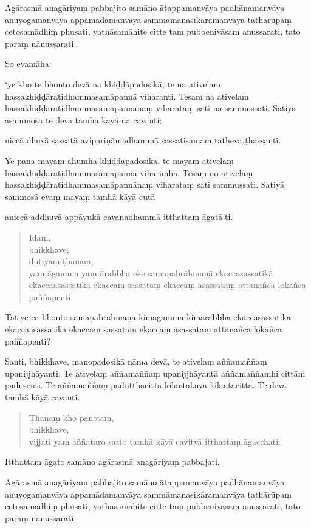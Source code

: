 \documentclass[11pt,twoside,openright]{book}
\begin{document}
\pstart
Agārasmā anagāriyaṃ pabbajito samāno ātappamanvāya padhānamanvāya anuyogamanvāya appamādamanvāya sammāmanasikāramanvāya tathārūpaṃ cetosamādhiṃ phusati, yathāsamāhite citte taṃ pubbenivāsaṃ anussarati, tato paraṃ nānussarati.
\pend

\pstart
So evamāha:
\pend

\pstart
‘ye kho te bhonto devā na khiḍḍāpadosikā, te na ativelaṃ hassakhiḍḍāratidhammasamāpannā viharanti. Tesaṃ na ativelaṃ hassakhiḍḍāratidhammasamāpannānaṃ viharataṃ sati na sammussati. Satiyā asammosā te devā tamhā kāyā na cavanti;
\pend

\pstart
niccā dhuvā sassatā avipariṇāmadhammā sassatisamaṃ tatheva ṭhassanti.
\pend

\pstart
Ye pana mayaṃ ahumhā khiḍḍāpadosikā, te mayaṃ ativelaṃ hassakhiḍḍāratidhammasamāpannā viharimhā. Tesaṃ no ativelaṃ hassakhiḍḍāratidhammasamāpannānaṃ viharataṃ sati sammussati. Satiyā sammosā evaṃ mayaṃ tamhā kāyā cutā
\pend

\pstart
aniccā addhuvā appāyukā cavanadhammā itthattaṃ āgatā’ti.
\pend

\begin{verse}
Idaṃ,\\
\vin  bhikkhave,\\
\vin  dutiyaṃ ṭhānaṃ,\\
\vin  yaṃ āgamma yaṃ ārabbha eke samaṇabrāhmaṇā ekaccasassatikā ekaccaasassatikā ekaccaṃ sassataṃ ekaccaṃ asassataṃ attānañca lokañca paññapenti.

\end{verse}
\pstart
Tatiye ca bhonto samaṇabrāhmaṇā kimāgamma kimārabbha ekaccasassatikā ekaccaasassatikā ekaccaṃ sassataṃ ekaccaṃ asassataṃ attānañca lokañca paññapenti?
\pend

\pstart
Santi, bhikkhave, manopadosikā nāma devā, te ativelaṃ aññamaññaṃ upanijjhāyanti. Te ativelaṃ aññamaññaṃ upanijjhāyantā aññamaññamhi cittāni padūsenti. Te aññamaññaṃ paduṭṭhacittā kilantakāyā kilantacittā. Te devā tamhā kāyā cavanti.
\pend

\begin{verse}
Ṭhānaṃ kho panetaṃ,\\
\vin  bhikkhave,\\
\vin  vijjati yaṃ aññataro satto tamhā kāyā cavitvā itthattaṃ āgacchati.

\end{verse}
\pstart
Itthattaṃ āgato samāno agārasmā anagāriyaṃ pabbajati.
\pend

\pstart
Agārasmā anagāriyaṃ pabbajito samāno ātappamanvāya padhānamanvāya anuyogamanvāya appamādamanvāya sammāmanasikāramanvāya tathārūpaṃ cetosamādhiṃ phusati, yathāsamāhite citte taṃ pubbenivāsaṃ anussarati, tato paraṃ nānussarati.
\pend
\end{document}
